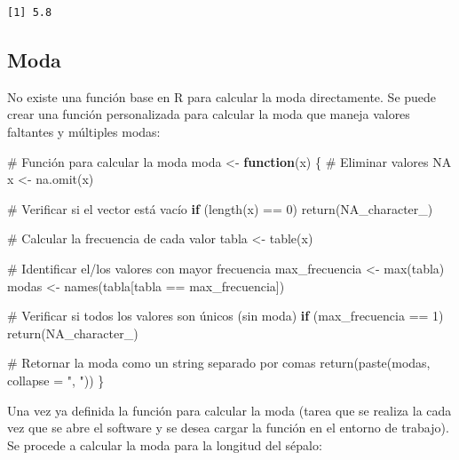 \documentclass[
  spanish,
  letterpaper,
]{book}
\newenvironment{Shaded}{\begin{snugshade}}{\end{snugshade}}
\newcommand{\AttributeTok}[1]{\textcolor[rgb]{0.40,0.45,0.13}{#1}}
\newcommand{\CommentTok}[1]{\textcolor[rgb]{0.37,0.37,0.37}{#1}}
\newcommand{\ConstantTok}[1]{\textcolor[rgb]{0.56,0.35,0.01}{#1}}
\newcommand{\ControlFlowTok}[1]{\textcolor[rgb]{0.00,0.23,0.31}{\textbf{#1}}}
\newcommand{\DecValTok}[1]{\textcolor[rgb]{0.68,0.00,0.00}{#1}}
\newcommand{\FunctionTok}[1]{\textcolor[rgb]{0.28,0.35,0.67}{#1}}
\newcommand{\NormalTok}[1]{\textcolor[rgb]{0.00,0.23,0.31}{#1}}
\newcommand{\OtherTok}[1]{\textcolor[rgb]{0.00,0.23,0.31}{#1}}
\newcommand{\SpecialCharTok}[1]{\textcolor[rgb]{0.37,0.37,0.37}{#1}}
\newcommand{\StringTok}[1]{\textcolor[rgb]{0.13,0.47,0.30}{#1}}
\begin{document}
\begin{verbatim}
[1] 5.8
\end{verbatim}

\subsection{Moda}\label{moda-1}

No existe una función base en R para calcular la moda directamente. Se
puede crear una función personalizada para calcular la moda que maneja
valores faltantes y múltiples modas:

\begin{Shaded}
\begin{Highlighting}[]
\CommentTok{\# Función para calcular la moda}
\NormalTok{moda }\OtherTok{\textless{}{-}} \ControlFlowTok{function}\NormalTok{(x) \{}
  \CommentTok{\# Eliminar valores NA}
\NormalTok{  x }\OtherTok{\textless{}{-}} \FunctionTok{na.omit}\NormalTok{(x)}

  \CommentTok{\# Verificar si el vector está vacío}
  \ControlFlowTok{if}\NormalTok{ (}\FunctionTok{length}\NormalTok{(x) }\SpecialCharTok{==} \DecValTok{0}\NormalTok{) }\FunctionTok{return}\NormalTok{(}\ConstantTok{NA\_character\_}\NormalTok{)}

  \CommentTok{\# Calcular la frecuencia de cada valor}
\NormalTok{  tabla }\OtherTok{\textless{}{-}} \FunctionTok{table}\NormalTok{(x)}

  \CommentTok{\# Identificar el/los valores con mayor frecuencia}
\NormalTok{  max\_frecuencia }\OtherTok{\textless{}{-}} \FunctionTok{max}\NormalTok{(tabla)}
\NormalTok{  modas }\OtherTok{\textless{}{-}} \FunctionTok{names}\NormalTok{(tabla[tabla }\SpecialCharTok{==}\NormalTok{ max\_frecuencia])}

  \CommentTok{\# Verificar si todos los valores son únicos (sin moda)}
  \ControlFlowTok{if}\NormalTok{ (max\_frecuencia }\SpecialCharTok{==} \DecValTok{1}\NormalTok{) }\FunctionTok{return}\NormalTok{(}\ConstantTok{NA\_character\_}\NormalTok{)}

  \CommentTok{\# Retornar la moda como un string separado por comas}
  \FunctionTok{return}\NormalTok{(}\FunctionTok{paste}\NormalTok{(modas, }\AttributeTok{collapse =} \StringTok{", "}\NormalTok{))}
\NormalTok{\}}
\end{Highlighting}
\end{Shaded}

Una vez ya definida la función para calcular la moda (tarea que se
realiza la cada vez que se abre el software y se desea cargar la función
en el entorno de trabajo). Se procede a calcular la moda para la
longitud del sépalo:
\end{document}
